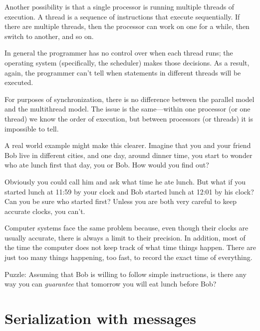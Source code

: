 \documentclass{book}
\newcommand{\clearemptydoublepage}{\newpage\cleardoublepage}
\begin{document}
Another possibility is that a single processor is running multiple
threads of execution.  A thread is a sequence of instructions
that execute sequentially.  If there are multiple threads, then
the processor can work on one for a while, then switch to
another, and so on.

In general the programmer has no control over when each thread runs;
the operating system (specifically, the scheduler) makes those
decisions.  As a result, again, the programmer can't tell when
statements in different threads will be executed.

For purposes of synchronization, there is no difference between the
parallel model and the multithread model.  The issue is the
same---within one processor (or one thread) we know the order of
execution, but between processors (or threads) it is impossible to
tell.

A real world example might make this clearer.  Imagine that you and
your friend Bob live in different cities, and one day, around dinner
time, you start to wonder who ate lunch first that day, you or Bob.
How would you find out?

Obviously you could call him and ask what time he ate lunch.  But what
if you started lunch at 11:59 by your clock and Bob started lunch at
12:01 by his clock?  Can you be sure who started first?  Unless you
are both very careful to keep accurate clocks, you can't.

Computer systems face the same problem because, even though their
clocks are usually accurate, there is always a limit to their
precision.  In addition, most of the time the computer does not keep
track of what time things happen.  There are just too many things
happening, too fast, to record the exact time of everything.

Puzzle: Assuming that Bob is willing to follow simple instructions, is
there any way you can {\em guarantee} that tomorrow you will eat lunch
before Bob?

\clearemptydoublepage
\section {Serialization with messages}
\label{serialization}
\end{document}
